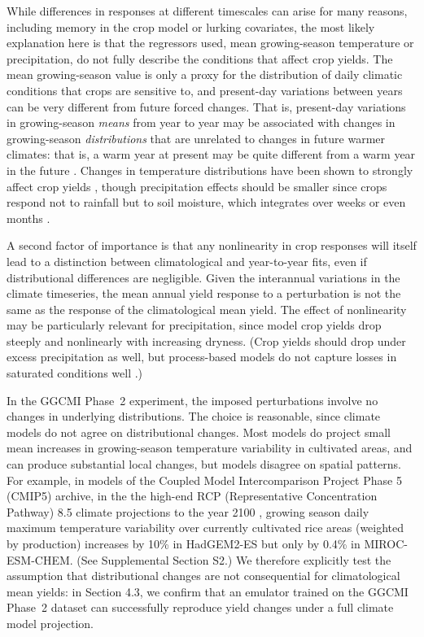 \documentclass[gmdd]{copernicus} %
\begin{document}
While differences in responses at different timescales can arise for many reasons, including memory in the crop model or lurking covariates, the most likely explanation here is that the regressors used, mean growing-season temperature or precipitation, do not fully describe the conditions that affect crop yields. 
The mean growing-season value is only a proxy for the distribution of daily climatic conditions that crops are sensitive to, and present-day variations between years can be very different from future forced changes. 
That is, present-day variations in growing-season \textit{means} from year to year may be associated with changes in growing-season \textit{distributions} that are unrelated to changes in future warmer climates: that is, a warm year at present may be quite different from a warm year in the future \citep[e.g.][]{Ruane2016}.
Changes in temperature distributions have been shown to strongly affect crop yields \citep[e.g.][]{Hansen2000, Gadgil2002}, though precipitation effects should be smaller since crops respond not to rainfall but to soil moisture, which integrates over weeks or even months \citep[e.g.][]{potter2005effects, Glotter14, CHALLINOR200499}. 

A second factor of importance is that any nonlinearity in crop responses will itself lead to a distinction between climatological and year-to-year fits, even if distributional differences are negligible. 
Given the interannual variations in the climate timeseries, the mean annual yield response to a perturbation is not the same as the response of the climatological mean yield. 
The effect of nonlinearity may be particularly relevant for precipitation, since model crop yields drop steeply and nonlinearly with increasing dryness. 
(Crop yields should drop under excess precipitation as well, but process-based models do not capture losses in saturated conditions well \citep{Glotter15,Li2019}.) 

In the GGCMI Phase~2 experiment, the imposed perturbations involve no changes in underlying distributions.
The choice is reasonable, since climate models do not agree on distributional changes.
Most models do project small mean increases in growing-season temperature variability in cultivated areas, and can produce substantial local changes, but models disagree on spatial patterns.
For example, in models of the Coupled Model Intercomparison Project Phase 5 (CMIP5) archive, in the the high-end RCP (Representative Concentration Pathway) 8.5 climate projections to the year 2100 \citep{riahi2011rcp}, growing season daily maximum temperature variability over currently cultivated rice areas (weighted by production) increases by 10\% in HadGEM2-ES but only by 0.4\% in MIROC-ESM-CHEM. (See Supplemental Section S2.)
We therefore explicitly test the assumption that distributional changes are not consequential for climatological mean yields: in Section 4.3, we confirm that an emulator trained on the GGCMI Phase~2 dataset can successfully reproduce yield changes under a full climate model projection.
\end{document}
